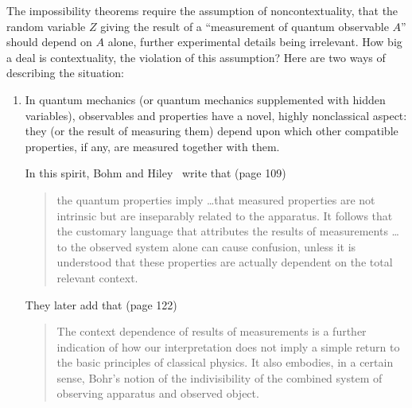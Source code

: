 \documentclass[12pt]{article}
\begin{document}
The impossibility theorems require the assumption of noncontextuality,
that the random variable $Z$ giving the result of a ``measurement of
quantum observable $A$'' should depend on $A$ alone, further
experimental details being irrelevant. How big a deal is
contextuality, the violation of this assumption? Here are two ways of
describing the situation:
\begin{enumerate}
\item In quantum mechanics (or quantum mechanics supplemented with
   hidden variables), observables and properties have a novel, highly
   nonclassical aspect: they (or the result of measuring them) depend
   upon which other compatible properties, if any, are measured
   together with them.

   In this spirit, Bohm and Hiley~\cite{bohi} write that (page 109)
\begin{quotation}\setlength{\baselineskip}{12pt}\noindent
   the quantum properties imply \dots that measured properties are not
   intrinsic but are inseparably related to the apparatus. It follows
   that the customary language that attributes the results of
   measurements \dots to the observed system alone can cause confusion,
   unless it is understood that these properties are actually dependent
   on the total relevant context.
\end{quotation}
They later add that (page 122)
\begin{quotation}\setlength{\baselineskip}{12pt}\noindent
   The context dependence of results of measurements is a further
   indication of how our interpretation does not imply a simple return
   to the basic principles of classical physics. It also embodies, in a
   certain sense, Bohr's notion of the indivisibility of the combined
   system of observing apparatus and observed object.
\end{quotation}
\smallskip


\end{enumerate}
\end{document}
